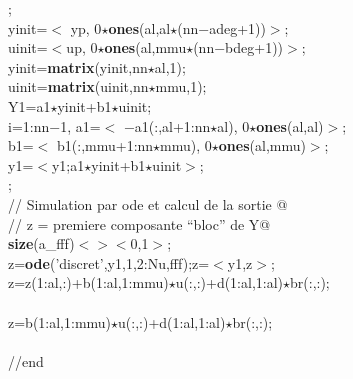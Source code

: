 {\begin{flushleft}
{;\\ 
\cmarg yinit=$<$ yp, 0$\star${\bf ones}(al,al$\star$(nn$-$adeg+1))$>$;\\ 
\cmarg uinit=$<$up, 0$\star${\bf ones}(al,mmu$\star$(nn$-$bdeg+1))$>$;\\ 
\cmarg yinit={\bf matrix}(yinit,nn$\star$al,1);\\ 
\cmarg uinit={\bf matrix}(uinit,nn$\star$mmu,1);\\ 
\cmarg Y1=a1$\star$yinit+b1$\star$uinit;\\ 
 i=1:nn$-$1, a1=$<$ $-$a1(:,al+1:nn$\star$al), 0$\star${\bf ones}(al,al)$>$;\\ 
\cmarg \hspace{2.8cm}b1=$<$ b1(:,mmu+1:nn$\star$mmu), 0$\star${\bf ones}(al,mmu)$>$;\\ 
\cmarg \hspace{2.8cm}y1=$<$y1;a1$\star$yinit+b1$\star$uinit$>$;\\ 
;\\ 
\cmarg \verb@// Simulation par ode et calcul de la sortie @\\ 
\cmarg \verb@// z = premiere composante ``bloc'' de Y@\\ 
 {\bf size}(a\_fff)$<$$>$$<$0,1$>$;\\ 
\cmarg \hspace{0.8cm}z={\bf ode}('discret',y1,1,2:Nu,fff);z=$<$y1,z$>$;\\ 
\cmarg \hspace{0.8cm}z=z(1:al,:)+b(1:al,1:mmu)$\star$u(:,:)+d(1:al,1:al)$\star$br(:,:);\\ 
 \\ 
\cmarg \hspace{0.8cm}z=b(1:al,1:mmu)$\star$u(:,:)+d(1:al,1:al)$\star$br(:,:);\\ 
\\ 
\cmarg //end }
\end{flushleft}}



